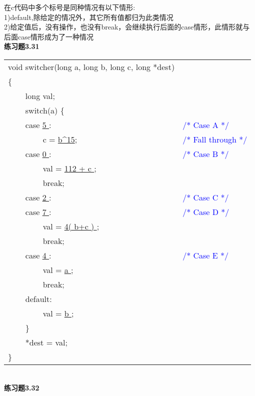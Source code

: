 \documentclass{article}
\newcommand{\blue}[1]{\textcolor{blue}{#1}}
\begin{document}
\begin{CJK}{UTF8}{uyhei}
在c代码中多个标号是同种情况有以下情形:	\\
1)default,除给定的情况外，其它所有值都归为此类情况	\\
2)给定值后，没有操作，也没有break，会继续执行后面的case情形，此情形就与后面case情形成为了一种情况	\\[2ex]
\newpage
\noindent\textbf{练习题3.31}	\\[-4ex]
\begin{table}[ht]
\begin{tabular}{m{2em}m{2em}m{8em}l}
	\multicolumn{3}{l}{void switcher(long a, long b, long c, long *dest)}	\\
	\multicolumn{3}{l}{\{}	\\
	&	\multicolumn{2}{l}{long val;}	\\
	&	\multicolumn{2}{l}{switch(a) \{}	\\
	&	\multicolumn{2}{l}{case \underline{ 5 }:}	&	\blue{/* Case A */}	\\
	&	&	c = \underline{b\^{}15};	&	\blue{/* Fall through */}	\\
	&	\multicolumn{2}{l}{case \underline{ 0 }:}	&	\blue{/* Case B */}	\\
	&	&	val = \underline{ 112 + c };	\\
	&	&	break;	\\
	&	\multicolumn{2}{l}{case \underline{ 2 }:}	&	\blue{/* Case C */}	\\
	&	\multicolumn{2}{l}{case \underline{ 7 }:}	&	\blue{/* Case D */}	\\
	&	&	val = \underline{ 4( b+c ) };	\\
	&	&	break;	\\
	&	\multicolumn{2}{l}{case \underline{ 4 }:}	&	\blue{/* Case E */}	\\
	&	&	val = \underline{ a };	\\
	&	&	break;	\\
	&	\multicolumn{2}{l}{default:}	\\
	&	&	val = \underline{ b };	\\
	&	\multicolumn{2}{l}{\}}	\\
	&	\multicolumn{2}{l}{*dest = val;}	\\
	\multicolumn{3}{l}{\}}	\\
\end{tabular}
\end{table}	\\[-1ex]
\textbf{练习题3.32}	\\[-4ex]
\renewcommand\arraystretch{1.4}
\begin{table}[htbp]
\centering

\end{table}
\end{CJK}
\end{document}
